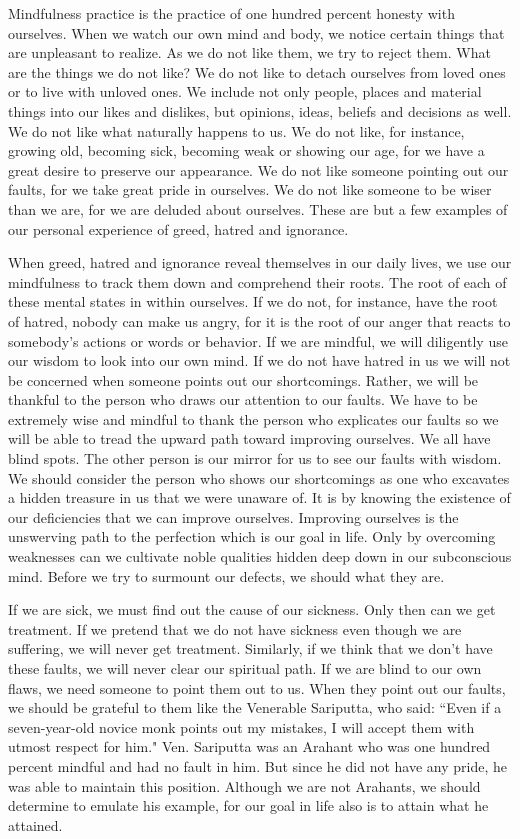 Mindfulness practice is the practice of one hundred percent honesty with
ourselves. When we watch our own mind and body, we notice certain things that
are unpleasant to realize. As we do not like them, we try to reject them. What
are the things we do not like? We do not like to detach ourselves from loved
ones or to live with unloved ones. We include not only people, places and
material things into our likes and dislikes, but opinions, ideas, beliefs and
decisions as well. We do not like what naturally happens to us. We do not like,
for instance, growing old, becoming sick, becoming weak or showing our age, for
we have a great desire to preserve our appearance. We do not like someone
pointing out our faults, for we take great pride in ourselves. We do not like
someone to be wiser than we are, for we are deluded about ourselves. These are
but a few examples of our personal experience of greed, hatred and ignorance.

When greed, hatred and ignorance reveal themselves in our daily lives, we use
our mindfulness to track them down and comprehend their roots. The root of each
of these mental states in within ourselves. If we do not, for instance, have the
root of hatred, nobody can make us angry, for it is the root of our anger that
reacts to somebody's actions or words or behavior. If we are mindful, we will
diligently use our wisdom to look into our own mind. If we do not have hatred in
us we will not be concerned when someone points out our shortcomings. Rather, we
will be thankful to the person who draws our attention to our faults. We have to
be extremely wise and mindful to thank the person who explicates our faults so
we will be able to tread the upward path toward improving ourselves. We all have
blind spots. The other person is our mirror for us to see our faults with
wisdom. We should consider the person who shows our shortcomings as one who
excavates a hidden treasure in us that we were unaware of. It is by knowing the
existence of our deficiencies that we can improve ourselves. Improving ourselves
is the unswerving path to the perfection which is our goal in life. Only by
overcoming weaknesses can we cultivate noble qualities hidden deep down in our
subconscious mind. Before we try to surmount our defects, we should what they
are.

If we are sick, we must find out the cause of our sickness. Only then can we get
treatment. If we pretend that we do not have sickness even though we are
suffering, we will never get treatment. Similarly, if we think that we don't
have these faults, we will never clear our spiritual path. If we are blind to
our own flaws, we need someone to point them out to us. When they point out our
faults, we should be grateful to them like the Venerable Sariputta, who said:
``Even if a seven-year-old novice monk points out my mistakes, I will accept them
with utmost respect for him." Ven. Sariputta was an Arahant who was one hundred
percent mindful and had no fault in him. But since he did not have any pride, he
was able to maintain this position. Although we are not Arahants, we should
determine to emulate his example, for our goal in life also is to attain what he
attained.

